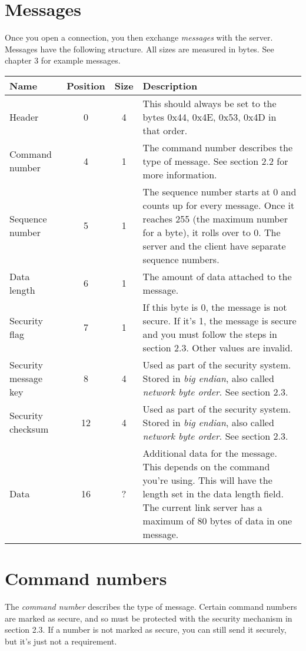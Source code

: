 \documentclass{report}
\begin{document}
\section{Messages}
Once you open a connection, you then exchange \emph{messages} with the server.
Messages have the following structure. All sizes are measured in bytes. See chapter 3 for example messages.
\begin{center}
\begin{tabular}{ l c c m{10 cm} }
	Name & Position & Size & Description \\
	\hline
	Header & 0 & 4 & This should always be set to the bytes 0x44, 0x4E, 0x53, 0x4D in that order. \\
	Command number & 4 & 1 & The command number describes the type of message. See section 2.2 for more information. \\
	Sequence number & 5 & 1 & The sequence number starts at 0 and counts up for every message. Once it reaches 255 (the maximum number for a byte), it rolls over to 0. The server and the client have separate sequence numbers. \\
	Data length & 6 & 1 & The amount of data attached to the message. \\
	Security flag & 7 & 1 & If this byte is 0, the message is not secure. If it's 1, the message is secure and you must follow the steps in section 2.3. Other values are invalid. \\
	Security message key & 8 & 4 & Used as part of the security system. Stored in \emph{big endian}, also called \emph{network byte order}. See section 2.3. \\
	Security checksum & 12 & 4 & Used as part of the security system. Stored in \emph{big endian}, also called \emph{network byte order}. See section 2.3. \\
	Data & 16 & ? & Additional data for the message. This depends on the command you're using. This will have the length set in the data length field. The current link server has a maximum of 80 bytes of data in one message.
\end{tabular}
\end{center}

\pagebreak
\section{Command numbers}
The \emph{command number} describes the type of message.
Certain command numbers are marked as secure, and so must be protected with the security mechanism in section 2.3.
If a number is not marked as secure, you can still send it securely, but it's just not a requirement.
\end{document}
